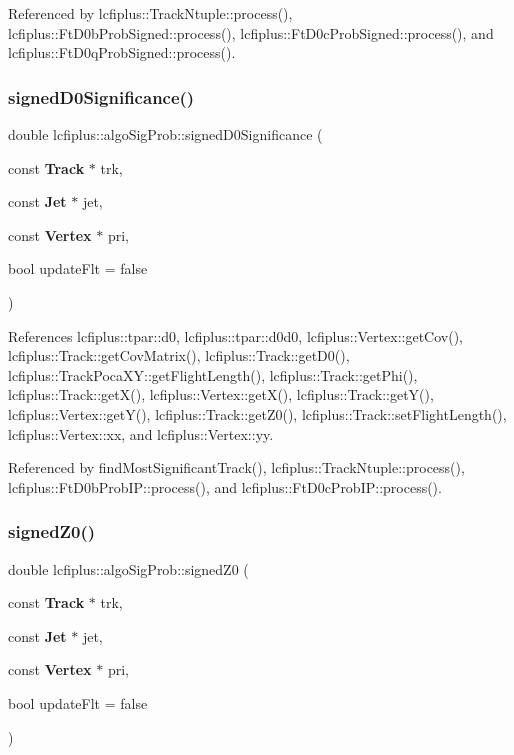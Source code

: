 Referenced by lcfiplus\+::\+Track\+Ntuple\+::process(), lcfiplus\+::\+Ft\+D0b\+Prob\+Signed\+::process(), lcfiplus\+::\+Ft\+D0c\+Prob\+Signed\+::process(), and lcfiplus\+::\+Ft\+D0q\+Prob\+Signed\+::process().

\mbox{\label{namespacelcfiplus_1_1algoSigProb_a1648c125565400b9e96f9ce09b8975d8}} 
\subsubsection{signed\+D0\+Significance()}
{\footnotesize\ttfamily double lcfiplus\+::algo\+Sig\+Prob\+::signed\+D0\+Significance (\begin{DoxyParamCaption}\item[{const \textbf{ Track} $\ast$}]{trk,  }\item[{const \textbf{ Jet} $\ast$}]{jet,  }\item[{const \textbf{ Vertex} $\ast$}]{pri,  }\item[{bool}]{update\+Flt = {\ttfamily false} }\end{DoxyParamCaption})}



References lcfiplus\+::tpar\+::d0, lcfiplus\+::tpar\+::d0d0, lcfiplus\+::\+Vertex\+::get\+Cov(), lcfiplus\+::\+Track\+::get\+Cov\+Matrix(), lcfiplus\+::\+Track\+::get\+D0(), lcfiplus\+::\+Track\+Poca\+X\+Y\+::get\+Flight\+Length(), lcfiplus\+::\+Track\+::get\+Phi(), lcfiplus\+::\+Track\+::get\+X(), lcfiplus\+::\+Vertex\+::get\+X(), lcfiplus\+::\+Track\+::get\+Y(), lcfiplus\+::\+Vertex\+::get\+Y(), lcfiplus\+::\+Track\+::get\+Z0(), lcfiplus\+::\+Track\+::set\+Flight\+Length(), lcfiplus\+::\+Vertex\+::xx, and lcfiplus\+::\+Vertex\+::yy.



Referenced by find\+Most\+Significant\+Track(), lcfiplus\+::\+Track\+Ntuple\+::process(), lcfiplus\+::\+Ft\+D0b\+Prob\+I\+P\+::process(), and lcfiplus\+::\+Ft\+D0c\+Prob\+I\+P\+::process().

\mbox{\label{namespacelcfiplus_1_1algoSigProb_ad8868d4166de2cbd8284a9c95b53f887}} 
\subsubsection{signed\+Z0()}
{\footnotesize\ttfamily double lcfiplus\+::algo\+Sig\+Prob\+::signed\+Z0 (\begin{DoxyParamCaption}\item[{const \textbf{ Track} $\ast$}]{trk,  }\item[{const \textbf{ Jet} $\ast$}]{jet,  }\item[{const \textbf{ Vertex} $\ast$}]{pri,  }\item[{bool}]{update\+Flt = {\ttfamily false} }\end{DoxyParamCaption})}



